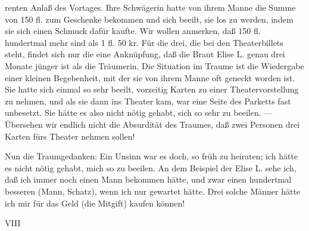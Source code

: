 \documentclass{article}
\begin{document}
         
            
            
            
        \pstart
        renten Anlaß des Vortages. Ihre Schwägerin hatte von ihrem Manne die
               Summe von 150 fl. zum Geschenke bekommen und sich beeilt, sie los zu werden, indem sie sich einen Schmuck dafür kaufte.
               Wir wollen anmerken, daß 150 fl. hundertmal mehr sind als 1 fl. 50 kr. Für die
                  drei, die bei den Theaterbillets steht,
               findet sich nur die eine Anknüpfung, daß die Braut Elise L. genau drei Monate jünger ist als die Träumerin. Die Situation im Traume ist die Wiedergabe einer kleinen Begebenheit, mit
               der sie von ihrem Manne oft geneckt worden ist. Sie hatte sich einmal so sehr
                  beeilt, vorzeitig Karten zu einer Theatervorstellung zu nehmen, und als sie dann ins Theater kam, war eine Seite des Parketts fast unbesetzt. Sie hätte
               es also nicht nötig gehabt, sich so sehr zu
                  beeilen. — Übersehen wir endlich nicht die Absurdität des Traumes, daß zwei Personen drei
               Karten fürs Theater nehmen sollen!
        \pend
    
            
        \pstart
        Nun die Traumgedanken: Ein Unsinn war es doch, so
               früh zu heiraten; ich hätte es nicht nötig gehabt,
                  mich so zu beeilen. An dem Beispiel der Elise L. sehe ich, daß ich immer
               noch einen Mann bekommen hätte, und zwar einen hundertmal besseren (Mann,
               Schatz), wenn ich nur gewartet hätte.
               Drei solche Männer hätte ich mir für das Geld (die
               Mitgift) kaufen können!
        \pend
    
         
            
            
            
        \pstart
        VIII
        \pend
    
\end{document}
